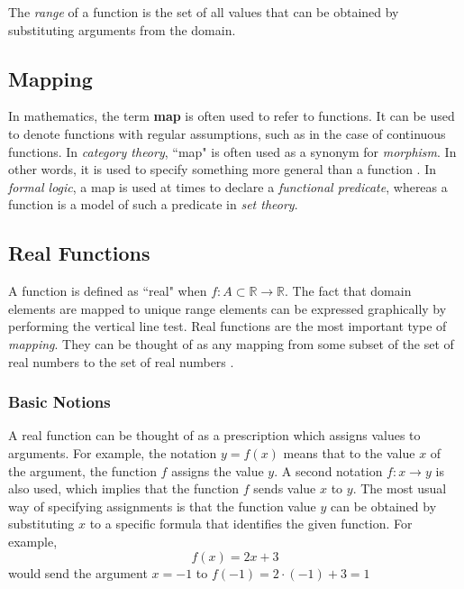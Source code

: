 \documentclass[11pt,oneside]{book}              %
\begin{document}
The \textit{range} of a function is the set of all values that can be obtained by substituting arguments from the domain.

\subsection{Mapping}
In mathematics, the term \textbf{map} is often used to refer to functions. It can be used to denote functions with regular assumptions, such as in the case of continuous functions. In \textit{category theory}, ``map" is often used as a synonym for \textit{morphism}. In other words, it is used to specify something more general than a function \cite{cattheory}. In \textit{formal logic}, a map is used at times to declare a \textit{functional predicate}, whereas a function is a model of such a predicate in \textit{set theory}.

\subsection{Real Functions}
A function is defined as ``real" when $f: A \subset \mathbb{R} \to \mathbb{R}$. The fact that domain elements are mapped to unique range elements can be expressed graphically by performing the vertical line test. Real functions are the most important type of \textit{mapping}. They can be thought of as any mapping from some subset of the set of real numbers to the set of real numbers \cite{mathfeld}.

\subsubsection{Basic Notions}
A real function can be thought of as a prescription which assigns values to arguments. For example, the notation $y = f(x)$ means that to the value $x$ of the argument, the function $f$ assigns the value $y$. A second notation $f: x \to y$ is also used, which implies that the function $f$ sends value $x$ to $y$. The most usual way of specifying assignments is that the function value $y$ can be obtained by substituting $x$ to a specific formula that identifies the given function. For example,
\begin{equation*}
f(x) = 2x + 3
\end{equation*}
would send the argument $x = -1$ to $f(-1) = 2 \cdot (-1) + 3 = 1$
\end{document}
